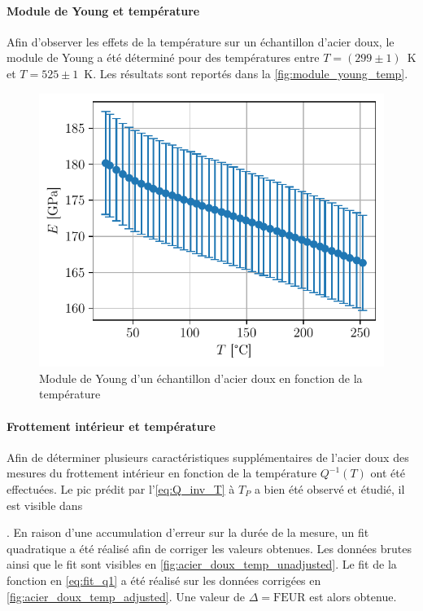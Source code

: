 \paragraph{Module de Young et température} Afin d'observer les effets de la température sur un échantillon d'acier doux, le module de Young a été déterminé pour des températures entre \mbox{\(T = (299 \pm 1)\) \si{\kelvin}} et \mbox{\(T = 525 \pm 1\) \si{\kelvin}}. Les résultats sont reportés dans la \autoref{fig:module_young_temp}.

\begin{figure}[h]
    \centering
    \includegraphics[width=0.6\linewidth]{figures/acier_doux_module_young_temp.pdf}
    \caption{Module de Young d'un échantillon d'acier doux en fonction de la température}
    \label{fig:module_young_temp}
\end{figure}

\paragraph{Frottement intérieur et température} Afin de déterminer plusieurs caractéristiques supplémentaires de l'acier doux des mesures du frottement intérieur en fonction de la température $Q^{-1}(T)$ ont été effectuées. Le pic prédit par l'\autoref{eq:Q_inv_T} à $T_P$ a bien été observé et étudié, il est visible dans


. En raison d'une accumulation d'erreur sur la durée de la mesure, un fit quadratique a été réalisé afin de corriger les valeurs obtenues. Les données brutes ainsi que le fit sont visibles en \autoref{fig:acier_doux_temp_unadjusted}. Le fit de la fonction en \autoref{eq:fit_q1} a été réalisé sur les données corrigées en \autoref{fig:acier_doux_temp_adjusted}. Une valeur de \(\Delta = \textrm{FEUR}\) est alors obtenue.

